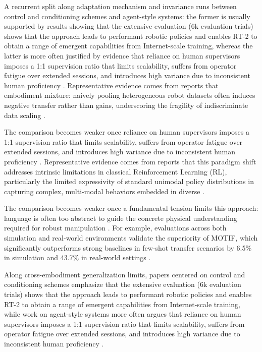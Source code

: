 \documentclass[a4paper,11pt]{article}
\begin{document}
A recurrent split along adaptation mechanism and invariance runs between control and conditioning schemes and agent-style systems: the former is usually supported by results showing that the extensive evaluation (6k evaluation trials) shows that the approach leads to performant robotic policies and enables RT-2 to obtain a range of emergent capabilities from Internet-scale training, whereas the latter is more often justified by evidence that reliance on human supervisors imposes a 1:1 supervision ratio that limits scalability, suffers from operator fatigue over extended sessions, and introduces high variance due to inconsistent human proficiency \citep{Brohan2023Vision,Chen2026Accelerating}. Representative evidence comes from reports that embodiment mixture: naively pooling heterogeneous robot datasets often induces negative transfer rather than gains, underscoring the fragility of indiscriminate data scaling \citep{Wang2026Rethinking}.

The comparison becomes weaker once reliance on human supervisors imposes a 1:1 supervision ratio that limits scalability, suffers from operator fatigue over extended sessions, and introduces high variance due to inconsistent human proficiency \citep{Chen2026Accelerating}. Representative evidence comes from reports that this paradigm shift addresses intrinsic limitations in classical Reinforcement Learning (RL), particularly the limited expressivity of standard unimodal policy distributions in capturing complex, multi-modal behaviors embedded in diverse \citep{Shao2025Generative}.

The comparison becomes weaker once a fundamental tension limits this approach: language is often too abstract to guide the concrete physical understanding required for robust manipulation \citep{Cui2026Contact}. For example, evaluations across both simulation and real-world environments validate the superiority of MOTIF, which significantly outperforms strong baselines in few-shot transfer scenarios by 6.5\% in simulation and 43.7\% in real-world settings \citep{Zhi2026Motif}.

Along cross-embodiment generalization limits, papers centered on control and conditioning schemes emphasize that the extensive evaluation (6k evaluation trials) shows that the approach leads to performant robotic policies and enables RT-2 to obtain a range of emergent capabilities from Internet-scale training, while work on agent-style systems more often argues that reliance on human supervisors imposes a 1:1 supervision ratio that limits scalability, suffers from operator fatigue over extended sessions, and introduces high variance due to inconsistent human proficiency \citep{Brohan2023Vision,Chen2026Accelerating}.
\end{document}
